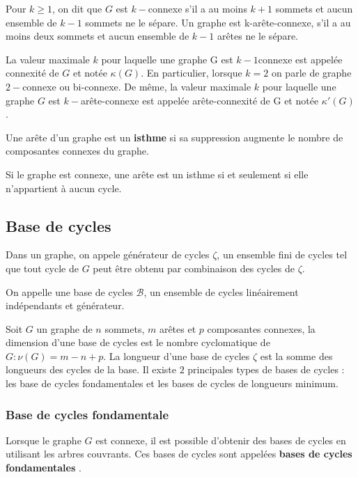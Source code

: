 \begin{definition}
 Pour $k \geq 1$, on dit que $G$ est $k-$connexe s'il a au moins $k+1$ sommets et aucun ensemble de $k -1$ sommets ne le sépare. Un graphe est k-arête-connexe, s'il a au moins deux sommets et aucun ensemble de $k - 1$ arêtes ne le sépare. 
\end{definition}

La valeur maximale $k$ pour laquelle une graphe G est $k - 1 $connexe est appelée connexité de $G$ et notée $\kappa(G)$. En particulier, lorsque $k = 2$ on parle de graphe $2-$connexe ou bi-connexe.
De même, la valeur maximale $k$ pour laquelle une graphe $G$ est $k-$arête-connexe est appelée arête-connexité de G et notée $\kappa′(G)$.

\begin{definition}
Une arête d'un graphe est un \textbf{isthme} si sa suppression augmente le nombre de composantes connexes du graphe. 
\end{definition}
Si le graphe est connexe, une arête est un isthme si et seulement si elle n'appartient à aucun cycle.

\subsection{Base de cycles}

Dans un graphe, on appele générateur de cycles $\zeta$, un ensemble fini de cycles tel que tout cycle de $G$ peut être obtenu par combinaison des cycles de $\zeta$.

\begin{definition}
On appelle une base de cycles $\mathcal{B}$, un ensemble de cycles linéairement indépendants et générateur.

\end{definition}

Soit $G$ un graphe de $n$ sommets, $m$ arêtes et $p$ composantes connexes,
la dimension d’une base de cycles est le nombre cyclomatique de $G: \nu(G)=m-n+p$. La longueur d'une base de cycles $\zeta$ est la somme des longueurs des cycles de la base. Il existe $2$ principales types de bases de cycles : les base de cycles fondamentales et les bases de cycles de longueurs minimum.

\subsubsection{Base de cycles fondamentale}

Lorsque le graphe $G$ est connexe, il est possible d'obtenir des bases de cycles en utilisant les arbres couvrants. Ces bases de cycles sont appelées \textbf{bases de cycles fondamentales} \cite{kir}.

